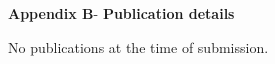 \begin{center}
	{\Large \textbf{Appendix B}}-\vspace*{0.5 cm}
	{\Large \textbf{Publication details}}
\end{center}
\begin{center}
	No publications at the time of submission.
\end{center}

